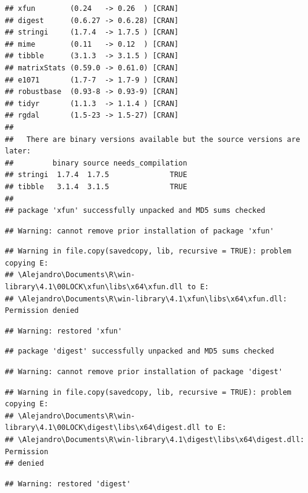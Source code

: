 \documentclass[
  10pt,
]{article}
\begin{document}
\begin{verbatim}
## xfun        (0.24   -> 0.26  ) [CRAN]
## digest      (0.6.27 -> 0.6.28) [CRAN]
## stringi     (1.7.4  -> 1.7.5 ) [CRAN]
## mime        (0.11   -> 0.12  ) [CRAN]
## tibble      (3.1.3  -> 3.1.5 ) [CRAN]
## matrixStats (0.59.0 -> 0.61.0) [CRAN]
## e1071       (1.7-7  -> 1.7-9 ) [CRAN]
## robustbase  (0.93-8 -> 0.93-9) [CRAN]
## tidyr       (1.1.3  -> 1.1.4 ) [CRAN]
## rgdal       (1.5-23 -> 1.5-27) [CRAN]
## 
##   There are binary versions available but the source versions are later:
##         binary source needs_compilation
## stringi  1.7.4  1.7.5              TRUE
## tibble   3.1.4  3.1.5              TRUE
## 
## package 'xfun' successfully unpacked and MD5 sums checked
\end{verbatim}

\begin{verbatim}
## Warning: cannot remove prior installation of package 'xfun'
\end{verbatim}

\begin{verbatim}
## Warning in file.copy(savedcopy, lib, recursive = TRUE): problem copying E:
## \Alejandro\Documents\R\win-library\4.1\00LOCK\xfun\libs\x64\xfun.dll to E:
## \Alejandro\Documents\R\win-library\4.1\xfun\libs\x64\xfun.dll: Permission denied
\end{verbatim}

\begin{verbatim}
## Warning: restored 'xfun'
\end{verbatim}

\begin{verbatim}
## package 'digest' successfully unpacked and MD5 sums checked
\end{verbatim}

\begin{verbatim}
## Warning: cannot remove prior installation of package 'digest'
\end{verbatim}

\begin{verbatim}
## Warning in file.copy(savedcopy, lib, recursive = TRUE): problem copying E:
## \Alejandro\Documents\R\win-library\4.1\00LOCK\digest\libs\x64\digest.dll to E:
## \Alejandro\Documents\R\win-library\4.1\digest\libs\x64\digest.dll: Permission
## denied
\end{verbatim}

\begin{verbatim}
## Warning: restored 'digest'
\end{verbatim}
\end{document}
